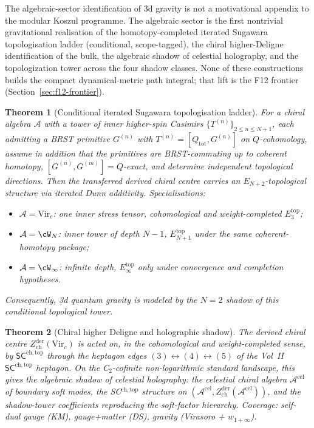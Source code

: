 \documentclass[11pt,reqno]{amsart}
\newtheorem{theorem}{Theorem}[section]
\theoremstyle{definition}
\theoremstyle{remark}
\providecommand{\cA}{\mathcal{A}}
\providecommand{\Vir}{\mathrm{Vir}}
\begin{document}
The algebraic-sector identification of 3d gravity is not a
motivational appendix to the modular Koszul programme. The
algebraic sector is the first nontrivial gravitational realisation
of the homotopy-completed iterated Sugawara topologisation ladder
(conditional, scope-tagged), the chiral higher-Deligne
identification of the bulk, the algebraic shadow of celestial
holography, and the topologization tower across the four shadow
classes. None of these constructions builds the compact
dynamical-metric path integral; that lift is the F12 frontier
(Section~\ref{sec:f12-frontier}).

\begin{theorem}[Conditional iterated Sugawara topologisation ladder]
\label{thm:einfty-ladder}
For a chiral algebra $\cA$ with a tower of inner higher-spin
Casimirs $\{T^{(n)}\}_{2 \le n \le N+1}$, each admitting a BRST
primitive $G^{(n)}$ with $T^{(n)} = [Q_{\mathrm{tot}}, G^{(n)}]$ on
$Q$-cohomology, assume in addition that the primitives are
BRST-commuting up to coherent homotopy,
$[G^{(n)},G^{(m)}]=Q$-exact, and determine independent topological
directions. Then the transferred derived chiral centre carries an
$E_{N+2}$-topological structure via iterated Dunn additivity.
Specialisations:
\begin{itemize}
\item $\cA = \Vir_c$: one inner stress tensor, cohomological and
  weight-completed $E_3^{\mathrm{top}}$;
\item $\cA = \cW_N$: inner tower of depth $N-1$,
  $E_{N+1}^{\mathrm{top}}$ under the same coherent-homotopy package;
\item $\cA = \cW_\infty$: infinite depth,
  $E_\infty^{\mathrm{top}}$ only under convergence and completion
  hypotheses.
\end{itemize}
Consequently, 3d quantum gravity is modeled by the $N = 2$ shadow of
this conditional topological tower.
\end{theorem}

\begin{theorem}[Chiral higher Deligne and holographic shadow]
\label{thm:chiral-higher-deligne-holography}
The derived chiral centre $Z^{\mathrm{der}}_{\mathrm{ch}}(\Vir_c)$
is acted on, in the cohomological and weight-completed sense, by
$\mathsf{SC}^{\mathrm{ch,top}}$ through the heptagon edges
$(3) \leftrightarrow (4) \leftrightarrow (5)$ of the Vol~II
$\mathsf{SC}^{\mathrm{ch,top}}$ heptagon. On the C$_2$-cofinite
non-logarithmic standard landscape, this gives the algebraic shadow
of celestial holography: the celestial chiral algebra
$\cA^{\mathrm{cel}}$ of boundary soft modes, the SC$^{\mathrm{ch,top}}$
structure on $(\cA^{\mathrm{cel}}, Z^{\mathrm{der}}_{\mathrm{ch}}(\cA^{\mathrm{cel}}))$,
and the shadow-tower coefficients reproducing the soft-factor
hierarchy. Coverage: self-dual gauge (KM), gauge+matter (DS),
gravity (Virasoro + $w_{1+\infty}$).
\end{theorem}
\end{document}
